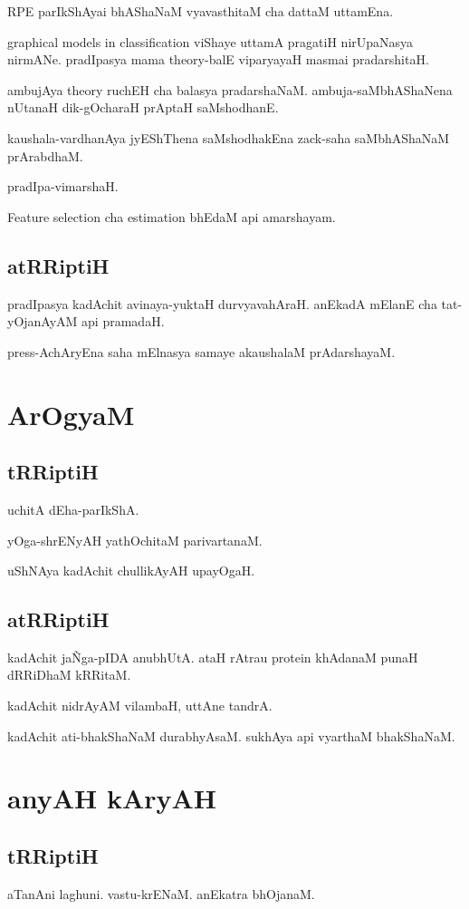 \documentclass[oneside, article]{memoir}
\begin{document}
RPE parIkShAyai bhAShaNaM vyavasthitaM cha dattaM uttamEna.

graphical models in classification viShaye uttamA pragatiH nirUpaNasya nirmANe. pradIpasya mama theory-balE viparyayaH masmai pradarshitaH.

ambujAya theory ruchEH cha balasya pradarshaNaM. ambuja-saMbhAShaNena nUtanaH dik-gOcharaH prAptaH saMshodhanE.

kaushala-vardhanAya jyEShThena saMshodhakEna  zack-saha saMbhAShaNaM prArabdhaM.

pradIpa-vimarshaH.

Feature selection cha estimation bhEdaM api amarshayam.

\subsection{atRRiptiH}
pradIpasya kadAchit avinaya-yuktaH durvyavahAraH. anEkadA mElanE cha tat-yOjanAyAM api pramadaH.

press-AchAryEna saha mElnasya samaye akaushalaM prAdarshayaM.

\section{ArOgyaM}
\subsection{tRRiptiH}
uchitA dEha-parIkShA.

yOga-shrENyAH yathOchitaM parivartanaM.

uShNAya kadAchit chullikAyAH upayOgaH.

\subsection{atRRiptiH}
kadAchit ja\~Nga-pIDA anubhUtA. ataH rAtrau protein khAdanaM punaH dRRiDhaM kRRitaM.

kadAchit nidrAyAM vilambaH, uttAne tandrA.

kadAchit ati-bhakShaNaM durabhyAsaM. sukhAya api vyarthaM bhakShaNaM.

\section{anyAH kAryAH}
\subsection{tRRiptiH}
aTanAni laghuni. vastu-krENaM. anEkatra bhOjanaM.
\end{document}
